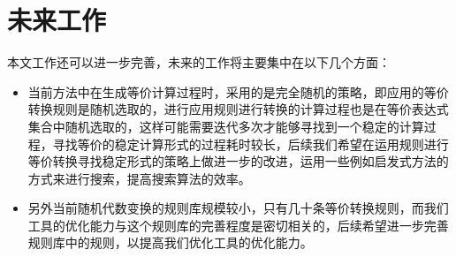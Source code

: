 \section{未来工作}

本文工作还可以进一步完善，未来的工作将主要集中在以下几个方面：

\begin{itemize}
    \item 当前方法中在生成等价计算过程时，采用的是完全随机的策略，即应用的等价转换规则是随机选取的，进行应用规则进行转换的计算过程也是在等价表达式集合中随机选取的，这样可能需要迭代多次才能够寻找到一个稳定的计算过程，寻找等价的稳定计算形式的过程耗时较长，后续我们希望在运用规则进行等价转换寻找稳定形式的策略上做进一步的改进，运用一些例如启发式方法的方式来进行搜索，提高搜索算法的效率。
    \item 另外当前随机代数变换的规则库规模较小，只有几十条等价转换规则，而我们工具的优化能力与这个规则库的完善程度是密切相关的，后续希望进一步完善规则库中的规则，以提高我们优化工具的优化能力。
\end{itemize}